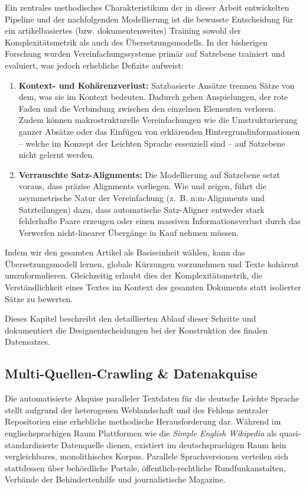 Ein zentrales methodisches Charakteristikum der in dieser Arbeit entwickelten Pipeline und der nachfolgenden Modellierung ist die bewusste Entscheidung für ein artikelbasiertes (bzw. dokumentenweites) Training sowohl der Komplexitätsmetrik als auch des Übersetzungsmodells. In der bisherigen Forschung wurden Vereinfachungssysteme primär auf Satzebene trainiert und evaluiert, was jedoch erhebliche Defizite aufweist:
\begin{enumerate}
    \item \textbf{Kontext- und Kohärenzverlust:} Satzbasierte Ansätze trennen Sätze von dem, was sie im Kontext bedeuten. Dadurch gehen Anspielungen, der rote Faden und die Verbindung zwischen den einzelnen Elementen verloren. Zudem können makrostrukturelle Vereinfachungen wie die Umstrukturierung ganzer Absätze oder das Einfügen von erklärenden Hintergrundinformationen – welche im Konzept der Leichten Sprache essenziell sind – auf Satzebene nicht gelernt werden.
    \item \textbf{Verrauschte Satz-Alignments:} Die Modellierung auf Satzebene setzt voraus, dass präzise Alignments vorliegen. Wie \citet{stodden2023deplain} und \citet{stajner2018cats} zeigen, führt die asymmetrische Natur der Vereinfachung (z.~B. n:m-Alignments und Satzteilungen) dazu, dass automatische Satz-Aligner entweder stark fehlerhafte Paare erzeugen oder einen massiven Informationsverlust durch das Verwerfen nicht-linearer Übergänge in Kauf nehmen müssen.
\end{enumerate}
Indem wir den gesamten Artikel als Basiseinheit wählen, kann das Übersetzungsmodell lernen, globale Kürzungen vorzunehmen und Texte kohärent umzuformulieren. Gleichzeitig erlaubt dies der Komplexitätsmetrik, die Verständlichkeit eines Textes im Kontext des gesamten Dokuments statt isolierter Sätze zu bewerten.

Dieses Kapitel beschreibt den detaillierten Ablauf dieser Schritte und dokumentiert die Designentscheidungen bei der Konstruktion des finalen Datensatzes.

\subsection{Multi-Quellen-Crawling \& Datenakquise}
\label{sec:crawling_datenakquise}

Die automatisierte Akquise paralleler Textdaten für die deutsche Leichte Sprache stellt aufgrund der heterogenen Weblandschaft und des Fehlens zentraler Repositorien eine erhebliche methodische Herausforderung dar. Während im englischsprachigen Raum Plattformen wie die \textit{Simple English Wikipedia} als quasi-standardisierte Datenquelle dienen, existiert im deutschsprachigen Raum kein vergleichbares, monolithisches Korpus. Parallele Sprachversionen verteilen sich stattdessen über behördliche Portale, öffentlich-rechtliche Rundfunkanstalten, Verbände der Behindertenhilfe und journalistische Magazine. 

